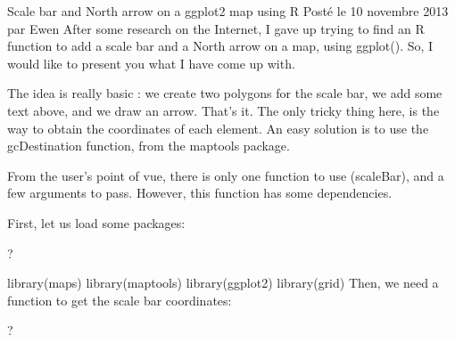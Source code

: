 

Scale bar and North arrow on a ggplot2 map using R
Posté le 10 novembre 2013 par Ewen
After some research on the Internet, I gave up trying to find an R function to add a scale bar and a North arrow on a map, using ggplot().
So, I would like to present you what I have come up with.

The idea is really basic : we create two polygons for the scale bar, we add some text above, and we draw an arrow. That’s it. The only tricky thing here, is the way to obtain the coordinates of each element. An easy solution is to use the gcDestination function, from the maptools package.

From the user’s point of vue, there is only one function to use (scaleBar), and a few arguments to pass. However, this function has some dependencies.

First, let us load some packages:

?

library(maps)
library(maptools)
library(ggplot2)
library(grid)
Then, we need a function to get the scale bar coordinates:

?

